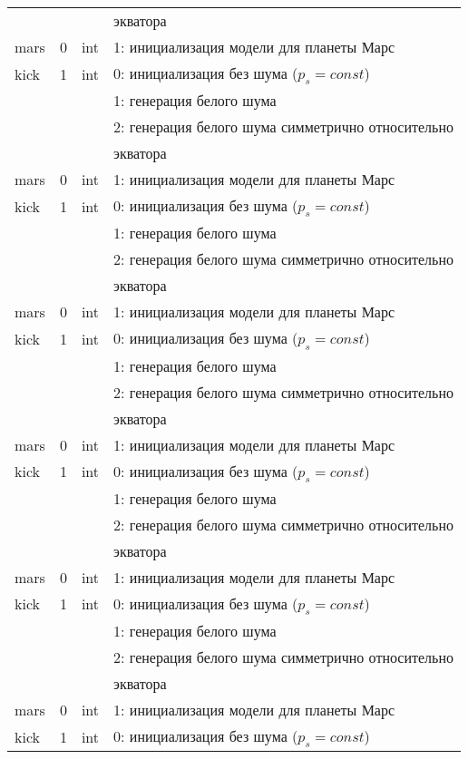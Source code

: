 \begin{longtable}[c]{|l|c|l|l|}
  & & & экватора    \\
 mars & 0 & int & 1: инициализация модели для планеты Марс     \\
kick & 1 & int & 0: инициализация без шума ($p_s = const$) \\
      &   &     & 1: генерация белого шума                  \\
      &   &     & 2: генерация белого шума симметрично относительно \\
  & & & экватора    \\
 mars & 0 & int & 1: инициализация модели для планеты Марс     \\
kick & 1 & int & 0: инициализация без шума ($p_s = const$) \\
      &   &     & 1: генерация белого шума                  \\
      &   &     & 2: генерация белого шума симметрично относительно \\
  & & & экватора    \\
 mars & 0 & int & 1: инициализация модели для планеты Марс     \\
kick & 1 & int & 0: инициализация без шума ($p_s = const$) \\
      &   &     & 1: генерация белого шума                  \\
      &   &     & 2: генерация белого шума симметрично относительно \\
  & & & экватора    \\
 mars & 0 & int & 1: инициализация модели для планеты Марс     \\
kick & 1 & int & 0: инициализация без шума ($p_s = const$) \\
      &   &     & 1: генерация белого шума                  \\
      &   &     & 2: генерация белого шума симметрично относительно \\
  & & & экватора    \\
 mars & 0 & int & 1: инициализация модели для планеты Марс     \\
kick & 1 & int & 0: инициализация без шума ($p_s = const$) \\
      &   &     & 1: генерация белого шума                  \\
      &   &     & 2: генерация белого шума симметрично относительно \\
  & & & экватора    \\
 mars & 0 & int & 1: инициализация модели для планеты Марс     \\
kick & 1 & int & 0: инициализация без шума ($p_s = const$) \\

\end{longtable}
